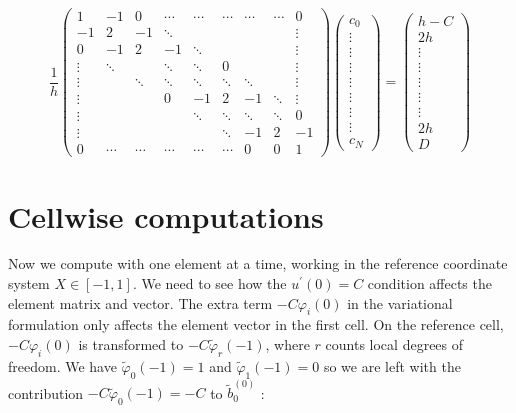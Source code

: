 \documentclass[../main.tex]{subfiles}
\begin{document}
		\begin{equation}
			\label{eqa192}
			\frac{1}{h}\left(\begin{array}{ccccccccc}
				1 & -1 & 0 & \cdots & \cdots & \cdots & \cdots & \cdots & 0 \\
				-1 & 2 & -1 & \ddots & & & & & \vdots \\
				0 & -1 & 2 & -1 & \ddots & & & & \vdots \\
				\vdots & \ddots & & \ddots & \ddots & 0 & & & \vdots \\
				\vdots & & \ddots & \ddots & \ddots & \ddots & \ddots & & \vdots \\
				\vdots & & & 0 & -1 & 2 & -1 & \ddots & \vdots \\
				\vdots & & & & \ddots & \ddots & \ddots & \ddots & 0 \\
				\vdots & & & & & \ddots & -1 & 2 & -1 \\
				0 & \cdots & \cdots & \cdots & \cdots & \cdots & 0 & 0 & 1
			\end{array}\right)\left(\begin{array}{c}
				c_{0} \\
				\vdots \\
				\vdots \\
				\vdots \\
				\vdots \\
				\vdots \\
				\vdots \\
				\vdots \\
				c_{N}
			\end{array}\right)=\left(\begin{array}{c}
				h-C \\
				2 h \\
				\vdots \\
				\vdots \\
				\vdots \\
				\vdots \\
				\vdots \\
				2 h \\
				D
			\end{array}\right)
		\end{equation}
	
	\section[Cellwise computations]{Cellwise computations}
		\label{sec:sec_15_5}
		\noindent Now we compute with one element at a time, working in the reference coordinate system $X \in[-1,1]$. We need to see how the $u^{\prime}(0)=C$ condition affects the element matrix and vector. The extra term $-C \varphi_{i}(0)$ in the variational formulation only affects the element vector in the first cell. On the reference cell, $-C \varphi_{i}(0)$ is transformed to $-C \tilde{\varphi}_{r}(-1)$, where $r$ counts local degrees of freedom. We have $\tilde{\varphi}_{0}(-1)=1$ and $\tilde{\varphi}_{1}(-1)=0$ so we are left with the contribution $-C \tilde{\varphi}_{0}(-1)=-C$ to $\tilde{b}_{0}^{(0)}$ :
\end{document}
